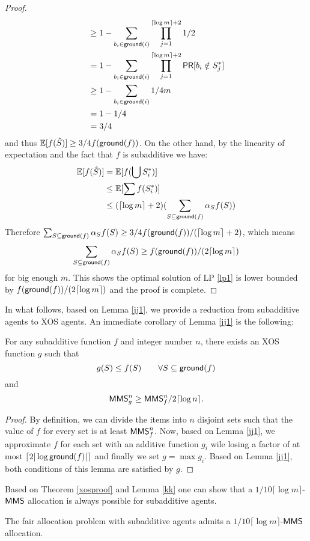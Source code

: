 \begin{proof}
\begin{equation*}
\begin{split}
& \geq 1- \sum_{b_i \in \mathsf{ground}(i)} \prod_{j=1}^{\lceil \log m \rceil + 2} 1/2\\
& = 1- \sum_{b_i \in \mathsf{ground}(i)} \prod_{j=1}^{\lceil \log m \rceil + 2} \mathsf{PR}[b_i \notin S^*_j]\\
& \geq 1- \sum_{b_i \in \mathsf{ground}(i)} 1/4m\\
& = 1- 1/4\\
& = 3/4\\
\end{split}
\end{equation*}
and thus $\mathbb{E}[f(\hat{S})] \geq 3/4 f(\mathsf{ground}(f))$. On the other hand, by the linearity of expectation and the fact that $f$ is subadditive we have:
\begin{equation*}
\begin{split}
\mathbb{E}[f(\hat{S})] &= \mathbb{E}[f(\bigcup S^*_i)]\\
& \leq \mathbb{E}[\sum f(S^*_i)]\\
& \leq (\lceil \log m \rceil + 2) (\sum_{S \subseteq \mathsf{ground}(f)} \alpha_S f(S))
\end{split}
\end{equation*}
Therefore $\sum_{S \subseteq \mathsf{ground}(f)} \alpha_S f(S) \geq 3/4 f(\mathsf{ground}(f)) / (\lceil \log m \rceil + 2)$, which means $$\sum_{S \subseteq \mathsf{ground}(f)} \alpha_S f(S) \geq f(\mathsf{ground}(f)) / (2\lceil \log m \rceil)$$ for big enough $m$. This shows the optimal solution of LP \ref{lp1} is lower bounded by $f(\mathsf{ground}(f)) / (2\lceil \log m \rceil)$ and the proof is complete.
\end{proof}

In what follows, based on Lemma \ref{jj1}, we provide a reduction from subadditive agents to XOS agents. An immediate corollary of Lemma \ref{jj1} is the following:
\begin{corollary}\label{kk}
For any subadditive function $f$ and integer number $n$, there exists an XOS function $g$ such that
$$g(S) \leq f(S) \qquad \forall S \subseteq \mathsf{ground}(f)$$
and 
$$\mathsf{MMS}_g^n \geq \mathsf{MMS}_f^n/2\lceil \log n \rceil.$$
\end{corollary} 
\begin{proof}
	By definition, we can divide the items into $n$ disjoint sets such that the value of $f$ for every set is at least $\mathsf{MMS}_f^n$. Now, based on Lemma \ref{jj1}, we approximate $f$ for each set with an additive function $g_i$ wile losing a factor of at most $\lceil 2 |\log \mathsf{ground}(f)|\rceil$ and finally we set $g = \max g_i$. Based on Lemma \ref{jj1}, both conditions of this lemma are satisfied by $g$.
\end{proof}

Based on Theorem \ref{xosproof} and Lemma \ref{kk} one can show that a $1/10\lceil \log m \rceil$-$\mathsf{MMS}$ allocation is always possible for subadditive agents.
\begin{theorem}\label{subadditiveproof}
	The fair allocation problem with subadditive agents admits a $1/10\lceil \log m \rceil$-$\mathsf{MMS}$ allocation.
\end{theorem}